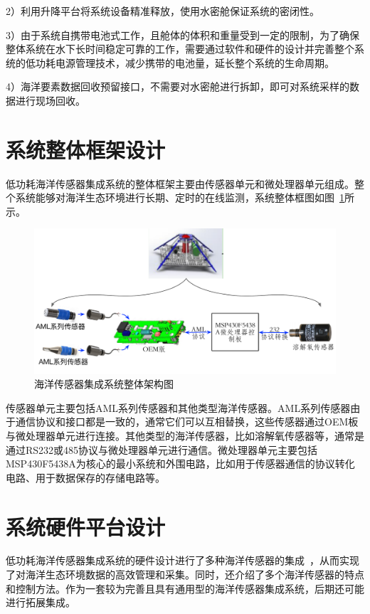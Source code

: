 2）利用升降平台将系统设备精准释放，使用水密舱保证系统的密闭性。

3）由于系统自携带电池式工作，且舱体的体积和重量受到一定的限制，为了确保整体系统在水下长时间稳定可靠的工作，需要通过软件和硬件的设计并完善整个系统的低功耗电源管理技术，减少携带的电池量，延长整个系统的生命周期。

4）海洋要素数据回收预留接口，不需要对水密舱进行拆卸，即可对系统采样的数据进行现场回收。

\section{系统整体框架设计}
低功耗海洋传感器集成系统的整体框架主要由传感器单元和微处理器单元组成。整个系统能够对海洋生态环境进行长期、定时的在线监测，系统整体框图如图~\ref{fig:系统框图}所示。

\begin{figure}[ht]
    \centering
	\includegraphics[width=1\textwidth]{fig/系统框图.pdf}
	\caption{海洋传感器集成系统整体架构图}
	\label{fig:系统框图}
\end{figure}

传感器单元主要包括AML系列传感器和其他类型海洋传感器。AML系列传感器由于通信协议和接口都是一致的，通常它们可以互相替换，这些传感器通过OEM板与微处理器单元进行连接。其他类型的海洋传感器，比如溶解氧传感器等，通常是通过RS232或485协议与微处理器单元进行通信。微处理器单元主要包括MSP430F5438A为核心的最小系统和外围电路，比如用于传感器通信的协议转化电路、用于数据保存的存储电路等。

\section{系统硬件平台设计}
低功耗海洋传感器集成系统的硬件设计进行了多种海洋传感器的集成~\cite{2015cd}，从而实现了对海洋生态环境数据的高效管理和采集。同时，还介绍了多个海洋传感器的特点和控制方法。作为一套较为完善且具有通用型的海洋传感器集成系统，后期还可能进行拓展集成。

